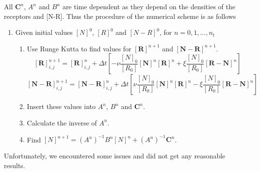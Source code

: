 \documentclass{article}
\begin{document}
All $\boldsymbol{C}^n$, $A^n$ and $B^n$ are time dependent as they depend on the densities of the receptors and [N-R]. Thus the procedure of the numerical scheme is as follows 
\begin{enumerate}
    \item Given initial values $[N]^0$, $[R]^0$ and $[N-R]^0$, for $n = 0, 1, ..., n_t$
    \begin{enumerate}
        \item Use Runge Kutta to find values for  $\boldsymbol{[R]}^{n+1}$ and $\boldsymbol{[N-R]}^{n+1}$. \begin{equation}
            \boldsymbol{[R]}^{n+1}_{i,j} = \boldsymbol{[R]}^{n}_{i,j} + \Delta t \left[- \nu \frac{[N]_0}{[R_0]} \boldsymbol{[N]}^{n} \boldsymbol{[R]}^{n} + \xi \frac{[N]_0}{[R_0]} \boldsymbol{[R-N]}^{n} \right]
        \end{equation} 
        \begin{equation}
            \boldsymbol{[N-R]}^{n+1}_{i,j} = \boldsymbol{[N-R]}^{n}_{i,j} + \Delta t \left[ \nu \frac{[N]_0}{[R_0]} \boldsymbol{[N]}^{n} \boldsymbol{[R]}^{n} - \xi \frac{[N]_0}{[R_0]} \boldsymbol{[R-N]}^{n} \right]
        \end{equation} 
        \item Insert these values into $A^n$, $B^n$ and $\boldsymbol{C}^n$.
        \item Calculate the inverse of $A^n$. 
        \item Find $[N]^{n+1} = (A^n)^{-1} B^n [N]^{n} + (A^n)^{-1}\boldsymbol{C}^n$.  
    \end{enumerate}
\end{enumerate}
Unfortunately, we encountered some issues and did not get any reasonable results.
\end{document}
